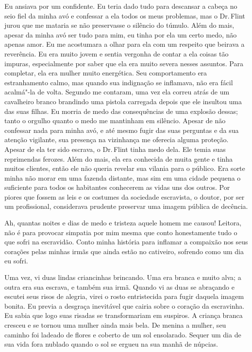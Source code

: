 Eu ansiava por um confidente. Eu teria
dado tudo para descansar a cabeça no seio fiel da minha avó e confessar
a ela todos os meus problemas, mas o Dr.\,Flint jurou que me mataria se
não preservasse o silêncio do túmulo. Além do mais, apesar da minha avó
ser tudo para mim, eu tinha por ela um certo medo, não apenas amor. Eu
me acostumara a olhar para ela com um respeito que beirava a reverência.
Eu era muito jovem e sentia vergonha de contar a ela coisas tão impuras,
especialmente por saber que ela era muito severa nesses assuntos. Para
completar, ela era mulher muito energética. Seu comportamento era
estranhamento calmo, mas quando sua indignação se inflamava, não era
fácil acalmá"-la de volta. Segundo me contaram, uma vez ela correu atrás
de um cavalheiro branco brandindo uma pistola carregada depois que ele
insultou uma das suas filhas. Eu morria de medo das consequências de uma
explosão dessas; tanto o orgulho quanto o medo me mantinham em silêncio.
Apesar de não confessar nada para minha avó, e até mesmo fugir das suas
perguntas e da sua atenção vigilante, sua presença na vizinhança me
oferecia alguma proteção. Apesar de ela ter sido escrava, o Dr.\,Flint
tinha medo dela. Ele temia suas reprimendas ferozes. Além do mais, ela
era conhecida de muita gente e tinha muitos clientes, então ele não
queria revelar sua vilania para o público. Era sorte minha não morar em
uma fazenda distante, mas sim em uma cidade pequena o suficiente para
todos os habitantes conhecerem as vidas uns dos outros. Por piores que
fossem as leis e os costumes da sociedade escravista, o doutor, por ser
um profissional, considerava prudente preservar uma imagem pública de
decência.

Ah, quantas noites e dias de medo e
tristeza aquele homem me causou! Leitora, não é para provocar simpatia
por mim mesma que conto honestamente tudo o que sofri na escravidão.
Conto minha história para inflamar a compaixão nos seus corações pelas
minhas irmãs que ainda estão no cativeiro, sofrendo como um dia eu
sofri.

Uma vez, vi duas lindas criancinhas
brincando. Uma era branca e muito alva; a outra era sua escrava, e
também sua irmã. Quando vi as duas se abraçando e escutei seus risos de
alegria, virei o rosto entristecida para fugir daquela imagem bonita. Eu
previa a desgraça inevitável que cairia sobre o coração da escravinha.
Eu sabia que logo suas risadas se transformariam em suspiros. A criança
branca cresceu e se tornou uma mulher ainda mais bela. De menina a
mulher, seu caminho foi ladeado de flores e coberto de um sol
ensolarado. Sequer um dia de sua vida fora nublado quando o sol se
ergueu na sua manhã de núpcias.

